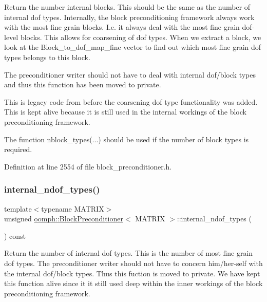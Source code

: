 Return the number internal blocks. This should be the same as the number of internal dof types. Internally, the block preconditioning framework always work with the most fine grain blocks. I.\+e. it always deal with the most fine grain dof-\/level blocks. This allows for coarsening of dof types. When we extract a block, we look at the Block\+\_\+to\+\_\+dof\+\_\+map\+\_\+fine vector to find out which most fine grain dof types belongs to this block. 

The preconditioner writer should not have to deal with internal dof/block types and thus this function has been moved to private.

This is legacy code from before the coarsening dof type functionality was added. This is kept alive because it is still used in the internal workings of the block preconditioning framework.

The function nblock\+\_\+types(...) should be used if the number of block types is required. 

Definition at line 2554 of file block\+\_\+preconditioner.\+h.

\mbox{\label{classoomph_1_1BlockPreconditioner_a4f3efe468cd6e133d6840ede8c3687b5}} 
\subsubsection{\texorpdfstring{internal\+\_\+ndof\+\_\+types()}{internal\_ndof\_types()}}
{\footnotesize\ttfamily template$<$typename M\+A\+T\+R\+IX$>$ \\
unsigned \hyperlink{classoomph_1_1BlockPreconditioner}{oomph\+::\+Block\+Preconditioner}$<$ M\+A\+T\+R\+IX $>$\+::internal\+\_\+ndof\+\_\+types (\begin{DoxyParamCaption}{ }\end{DoxyParamCaption}) const\hspace{0.3cm}{\ttfamily [inline]}}



Return the number of internal dof types. This is the number of most fine grain dof types. The preconditioner writer should not have to concern him/her-\/self with the internal dof/block types. Thus this fuction is moved to private. We have kept this function alive since it it still used deep within the inner workings of the block preconditioning framework. 



